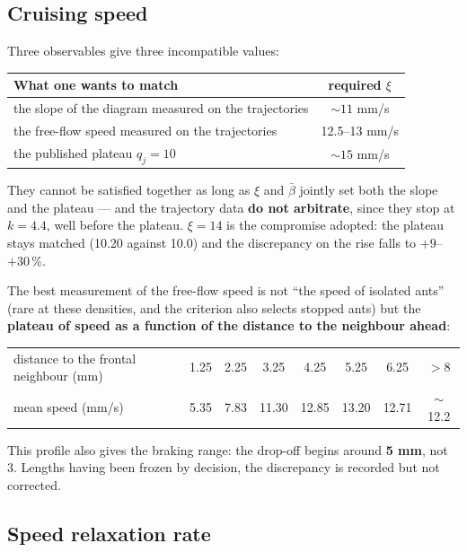 \documentclass[11pt,a4paper]{article}
\begin{document}
\subsection{Cruising speed}\label{sec:xi}

Three observables give three incompatible values:

\begin{center}
\begin{tabular}{@{}lc@{}}
\toprule
What one wants to match & required $\xi$ \\
\midrule
the slope of the diagram measured on the trajectories & $\sim11$ mm/s \\
the free-flow speed measured on the trajectories & 12.5--13 mm/s \\
the published plateau $q_j=10$ & $\sim15$ mm/s \\
\bottomrule
\end{tabular}
\end{center}

They cannot be satisfied together as long as $\xi$ and $\bar\beta$ jointly set
both the slope and the plateau --- and the trajectory data \textbf{do not
arbitrate}, since they stop at $k=4.4$, well before the plateau.
$\xi = 14$ is the compromise adopted: the plateau stays matched (10.20 against
10.0) and the discrepancy on the rise falls to $+9$--$+30$\,\%.

The best measurement of the free-flow speed is not ``the speed of isolated
ants'' (rare at these densities, and the criterion also selects stopped ants)
but the \textbf{plateau of speed as a function of the distance to the neighbour
ahead}:

\begin{center}
\begin{tabular}{@{}lccccccc@{}}
\toprule
distance to the frontal neighbour (mm) & 1.25 & 2.25 & 3.25 & 4.25 & 5.25 & 6.25 & $>8$ \\
mean speed (mm/s) & 5.35 & 7.83 & 11.30 & 12.85 & 13.20 & 12.71 & $\sim$12.2 \\
\bottomrule
\end{tabular}
\end{center}

This profile also gives the braking range: the drop-off begins around
\textbf{5 mm}, not 3. Lengths having been frozen by decision, the discrepancy
is recorded but not corrected.

\subsection{Speed relaxation rate}\label{sec:nu}
\end{document}
